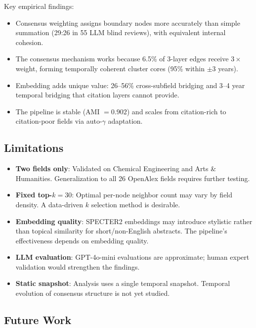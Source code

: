 \documentclass[11pt,a4paper]{article}
\begin{document}
Key empirical findings:
\begin{itemize}[nosep]
    \item Consensus weighting assigns boundary nodes more accurately than simple summation (29:26 in 55 LLM blind reviews), with equivalent internal cohesion.
    \item The consensus mechanism works because 6.5\% of 3-layer edges receive $3\times$ weight, forming temporally coherent cluster cores (95\% within $\pm$3 years).
    \item Embedding adds unique value: 26--56\% cross-subfield bridging and 3--4 year temporal bridging that citation layers cannot provide.
    \item The pipeline is stable (AMI $= 0.902$) and scales from citation-rich to citation-poor fields via auto-$\gamma$ adaptation.
\end{itemize}

\subsection{Limitations}

\begin{itemize}[nosep]
    \item \textbf{Two fields only}: Validated on Chemical Engineering and Arts \& Humanities. Generalization to all 26 OpenAlex fields requires further testing.
    \item \textbf{Fixed top-$k{=}30$}: Optimal per-node neighbor count may vary by field density. A data-driven $k$ selection method is desirable.
    \item \textbf{Embedding quality}: SPECTER2 embeddings may introduce stylistic rather than topical similarity for short/non-English abstracts. The pipeline's effectiveness depends on embedding quality.
    \item \textbf{LLM evaluation}: GPT-4o-mini evaluations are approximate; human expert validation would strengthen the findings.
    \item \textbf{Static snapshot}: Analysis uses a single temporal snapshot. Temporal evolution of consensus structure is not yet studied.
\end{itemize}

\subsection{Future Work}
\end{document}
